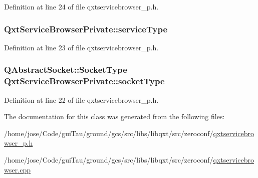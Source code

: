 Definition at line 24 of file qxtservicebrowser\-\_\-p.\-h.

\hypertarget{class_qxt_service_browser_private_a4360aeb42929ae409ebf36d1bbcc2e1d}{
\subsubsection[{service\-Type}]{ Qxt\-Service\-Browser\-Private\-::service\-Type}}\label{class_qxt_service_browser_private_a4360aeb42929ae409ebf36d1bbcc2e1d}


Definition at line 23 of file qxtservicebrowser\-\_\-p.\-h.

\hypertarget{class_qxt_service_browser_private_a630a97096cfea7bc1f77b95593cc265e}{
\subsubsection[{socket\-Type}]{\setlength{\rightskip}{0pt plus 5cm}Q\-Abstract\-Socket\-::\-Socket\-Type Qxt\-Service\-Browser\-Private\-::socket\-Type}}\label{class_qxt_service_browser_private_a630a97096cfea7bc1f77b95593cc265e}


Definition at line 22 of file qxtservicebrowser\-\_\-p.\-h.



The documentation for this class was generated from the following files\-:\begin{DoxyCompactItemize}
\item 
/home/jose/\-Code/gui\-Tau/ground/gcs/src/libs/libqxt/src/zeroconf/\hyperlink{qxtservicebrowser__p_8h}{qxtservicebrowser\-\_\-p.\-h}\item 
/home/jose/\-Code/gui\-Tau/ground/gcs/src/libs/libqxt/src/zeroconf/\hyperlink{qxtservicebrowser_8cpp}{qxtservicebrowser.\-cpp}\end{DoxyCompactItemize}
